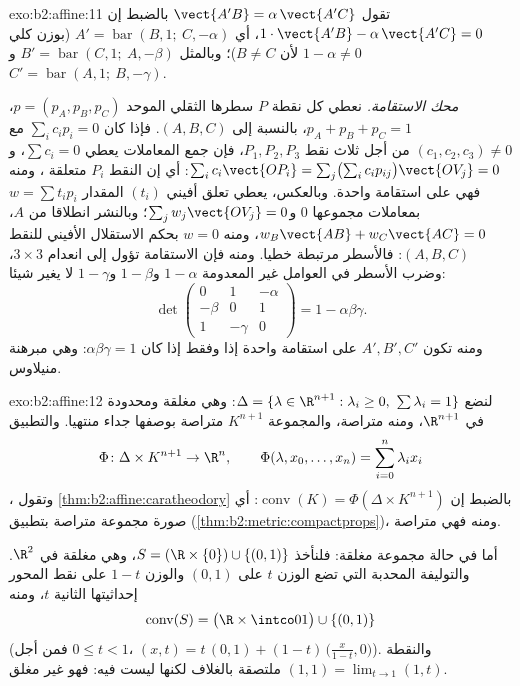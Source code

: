 \begin{solution}{exo:b2:affine:11}
تقول $\vect{A'B} = \alpha\,\vect{A'C}$ بالضبط إن $1\cdot
\vect{A'B} - \alpha\,\vect{A'C} = 0$، أي $A' =
\operatorname{bar}(B, 1;\ C, -\alpha)$ (بوزن كلي $1 -
\alpha \neq 0$ لأن
$B \neq C$)؛ وبالمثل $B' =
\operatorname{bar}(C, 1;\ A, -\beta)$ و$C' =
\operatorname{bar}(A, 1;\ B, -\gamma)$.

\emph{محك الاستقامة.} نعطي كل نقطة $P$ سطرها الثقلي الموحد $p = (p_A, p_B, p_C)$،
$p_A + p_B +
p_C = 1$، بالنسبة إلى $(A, B, C)$. فإذا كان $\sum_i c_i p_i = 0$ مع $(c_1, c_2, c_3) \neq 0$ من أجل ثلاث
نقط $P_1, P_2,
P_3$، فإن جمع المعاملات يعطي $\sum c_i = 0$، و$\sum_i c_i \vect{OP_i} = \sum_j \bigl(\sum_i
c_ip_{ij}\bigr)\vect{OV_j} = 0$: أي إن النقط
$P_i$ متعلقة ، ومنه فهي على استقامة واحدة. وبالعكس، يعطي
تعلق أفيني $(t_i)$ المقدار $w = \sum t_ip_i$ بمعاملات مجموعها $0$ و$\sum_j w_j\vect{OV_j} = 0$؛
وبالنشر انطلاقا من $A$، $w_B
\vect{AB} + w_C\vect{AC} = 0$، ومنه $w = 0$ بحكم الاستقلال
الأفيني للنقط $(A, B, C)$: فالأسطر مرتبطة خطيا.
ومنه فإن الاستقامة تؤول إلى انعدام  $3 \times 3$، وضرب الأسطر في
العوامل غير المعدومة $1 - \alpha$ و$1 -
\beta$ و$1 - \gamma$ لا يغير شيئا:
\[
\det\begin{pmatrix} 0 & 1 & -\alpha\\ -\beta & 0 & 1\\ 1 &
-\gamma & 0\end{pmatrix}
= 1 - \alpha\beta\gamma .
\]
ومنه تكون $A', B', C'$ على استقامة واحدة إذا وفقط إذا كان $\alpha\beta\gamma = 1$: وهي
مبرهنة منيلاوس.
\end{solution}

\begin{solution}{exo:b2:affine:12}
لنضع $\Delta = \{\lambda \in \R^{n+1} : \lambda_i \geq 0,\
\sum\lambda_i = 1\}$: وهي مغلقة ومحدودة في $\R^{n+1}$، ومنه متراصة، والمجموعة
$K^{n+1}$ متراصة بوصفها جداء منتهيا. والتطبيق
\[
\Phi \colon \Delta \times K^{n+1} \to \R^n, \qquad
\Phi(\lambda, x_0, \dots, x_n) = \sum_{i=0}^n \lambda_i x_i
\]
، وتقول \cref{thm:b2:affine:caratheodory} بالضبط إن $\operatorname{conv}(K) = \Phi(\Delta \times
K^{n+1})$: أي صورة مجموعة متراصة بتطبيق
 (\cref{thm:b2:metric:compactprops})، ومنه فهي متراصة.

أما في حالة مجموعة مغلقة: فلنأخذ $S = (\R \times \{0\}) \cup \{(0,
1)\}$، وهي مغلقة في $\R^2$.
والتوليفة المحدبة التي تضع الوزن $t$ على $(0,1)$ والوزن $1 - t$
على نقط المحور إحداثيتها الثانية $t$، ومنه
\[
\operatorname{conv}(S) = \bigl(\R \times \intco01\bigr) \cup
\{(0,1)\}
\]
(فمن أجل $0 \leq t < 1$، $(x, t) = t\,(0,1) + (1-t)\,\bigl(\tfrac
x{1-t}, 0\bigr)$). والنقطة $(1, 1) = \lim_{t \to 1}(1, t)$ ملتصقة بالغلاف لكنها ليست
فيه: فهو غير مغلق.
\end{solution}

